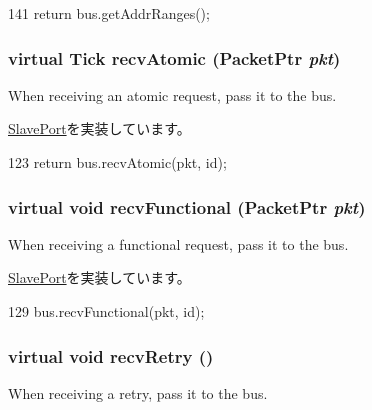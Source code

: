 \begin{DoxyCode}
141         { return bus.getAddrRanges(); }
\end{DoxyCode}
\hypertarget{classCoherentBus_1_1CoherentBusSlavePort_a9b5348b3521da3a6333e6b0eed3b98e6}{
\subsubsection[{recvAtomic}]{\setlength{\rightskip}{0pt plus 5cm}virtual {\bf Tick} recvAtomic ({\bf PacketPtr} {\em pkt})}}
\label{classCoherentBus_1_1CoherentBusSlavePort_a9b5348b3521da3a6333e6b0eed3b98e6}
When receiving an atomic request, pass it to the bus. 

\hyperlink{classSlavePort_a428ab07671bc9372dc44a2487b12a726}{SlavePort}を実装しています。


\begin{DoxyCode}
123         { return bus.recvAtomic(pkt, id); }
\end{DoxyCode}
\hypertarget{classCoherentBus_1_1CoherentBusSlavePort_a914924599c231593833dd1d527b4bb7c}{
\subsubsection[{recvFunctional}]{\setlength{\rightskip}{0pt plus 5cm}virtual void recvFunctional ({\bf PacketPtr} {\em pkt})}}
\label{classCoherentBus_1_1CoherentBusSlavePort_a914924599c231593833dd1d527b4bb7c}
When receiving a functional request, pass it to the bus. 

\hyperlink{classSlavePort_a6a3d6f2e5dab6bed16d53d9e7c17378d}{SlavePort}を実装しています。


\begin{DoxyCode}
129         { bus.recvFunctional(pkt, id); }
\end{DoxyCode}
\hypertarget{classCoherentBus_1_1CoherentBusSlavePort_a7ec461ad187b82b4b21e27c86e45cf9c}{
\subsubsection[{recvRetry}]{\setlength{\rightskip}{0pt plus 5cm}virtual void recvRetry ()}}
\label{classCoherentBus_1_1CoherentBusSlavePort_a7ec461ad187b82b4b21e27c86e45cf9c}
When receiving a retry, pass it to the bus. 

